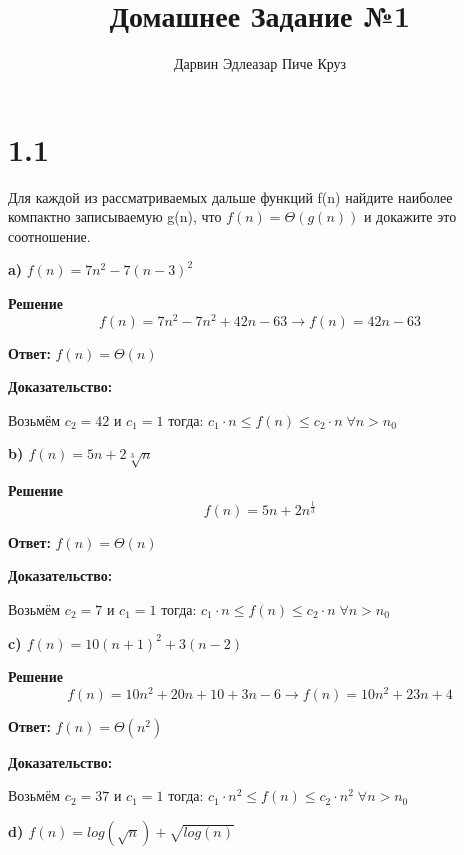\documentclass{article}
\title{Домашнее Задание №1}
\author{Дарвин Эдлеазар Пиче Круз}
\begin{document}
\maketitle

\section*{1.1}

Для каждой из рассматриваемых дальше функций f(n) найдите
наиболее компактно записываемую g(n), что $f(n) = \Theta(g(n))$ и докажите это соотношение.



\bigskip
\bigskip
\textbf{a)} $f(n) = 7n^2 - 7(n - 3)^2$

\textbf{Решение}
\begin{equation*}
    f(n) = 7n^2 - 7n^2 +42n - 63 \longrightarrow f(n) = 42n - 63
\end{equation*}

\textbf{Ответ:} $f(n) = \Theta(n)$

\textbf{Доказательство:}

Возьмём $c_2 = 42$ и $c_1 = 1$ тогда: $c_1 \cdot n \leq f(n) \leq c_2 \cdot n \; \forall n > n_0$ 

\bigskip
\bigskip
\textbf{b) $f(n) = 5n + 2\sqrt[3]{n}$}

\textbf{Решение}
\begin{equation*}
    f(n) = 5n + 2n^{\frac{1}{3}}
\end{equation*}

\textbf{Ответ:} $f(n) = \Theta(n)$

\textbf{Доказательство:}

Возьмём $c_2 = 7$ и $c_1 = 1$ тогда: $c_1 \cdot n \leq f(n) \leq c_2 \cdot n \; \forall n > n_0$ 

\bigskip
\bigskip
\textbf{c) $f(n) = 10(n + 1)^2 + 3(n - 2)$}

\textbf{Решение}
\begin{equation*}
    f(n) = 10n^2 + 20n + 10 + 3n - 6 \longrightarrow f(n)=10n^2+23n + 4
\end{equation*}

\textbf{Ответ:} $f(n) = \Theta(n^2)$

\textbf{Доказательство:}

Возьмём $c_2 = 37$ и $c_1 = 1$ тогда: $c_1 \cdot n^2 \leq f(n) \leq c_2 \cdot n^2 \; \forall n > n_0$ 

\bigskip
\bigskip
\textbf{d) $f(n) = log(\sqrt{n}) + \sqrt{log(n)}$}
\end{document}
